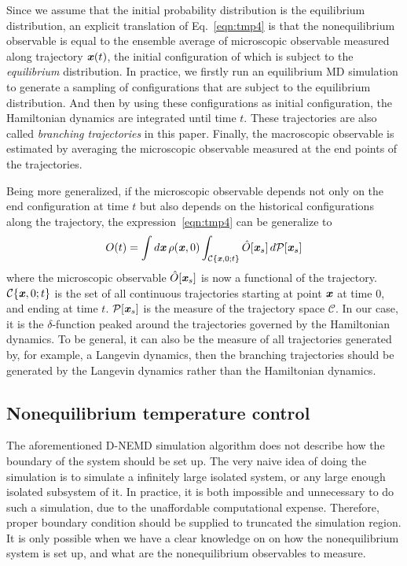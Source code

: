 \documentclass[aip,jcp,a4paper,preprint,onecolumn]{revtex4-1}
\newcommand{\vect}[1]{\textbf{\textit{#1}}}
\begin{document}
Since we assume that the initial
probability distribution is the equilibrium distribution, an
explicit translation of Eq.~\eqref{eqn:tmp4} is that the
nonequilibrium observable is equal to the ensemble average of
microscopic observable measured along trajectory $\vect x(t)$, the
initial configuration of which is subject to the \emph{equilibrium}
distribution. In practice, we firstly run an equilibrium MD simulation
to generate a sampling of configurations that are subject to the
equilibrium distribution. And then by using these configurations as
initial configuration, the Hamiltonian dynamics are integrated until
time $t$. These trajectories are also called \emph{branching
  trajectories} in this paper. Finally, the macroscopic observable is
estimated by averaging the microscopic observable measured at the end
points of the trajectories.

Being more generalized, if the microscopic observable depends not only on the end
configuration at time $t$ but also depends on the historical
configurations along the trajectory, the expression~\eqref{eqn:tmp4} can be generalize to
\begin{align}
  O(t) = \int d\vect x\,\rho(\vect x, 0) \int_{\mathcal C\{\vect x, 0; t\}} \hat O[\vect x_s] \,d\mathcal P[\vect x_s] 
\end{align}
where the microscopic observable $ \hat O[\vect x_s] $ is now a
functional of the trajectory.  $\mathcal C\{\vect x, 0; t\}$ is the
set of all continuous trajectories starting at point $\vect x$ at time
0, and ending at time $t$. $\mathcal P[\vect x_s] $ is the measure of
the trajectory space $\mathcal C$.  In our case, it is the
$\delta$-function peaked around the trajectories governed by the
Hamiltonian dynamics. To be general, it can also be the measure of all
trajectories generated by, for example, a Langevin dynamics, then the
branching trajectories should be generated by the Langevin
dynamics rather than the Hamiltonian dynamics.


\subsection{Nonequilibrium temperature control}\label{sec:tmp2b}

The aforementioned D-NEMD simulation algorithm
does not describe how the boundary of the system should be set up.
The very naive idea of doing the simulation
is to simulate a infinitely large isolated system, or any large enough
isolated subsystem of it. In practice, it is both impossible and unnecessary to
do such a simulation, due to the unaffordable computational expense.
Therefore, proper boundary condition should be supplied
to truncated the simulation region. It is only possible when we
have a clear knowledge on
on how the nonequilibrium system is set up,
and what are the nonequilibrium observables to measure.
\end{document}
